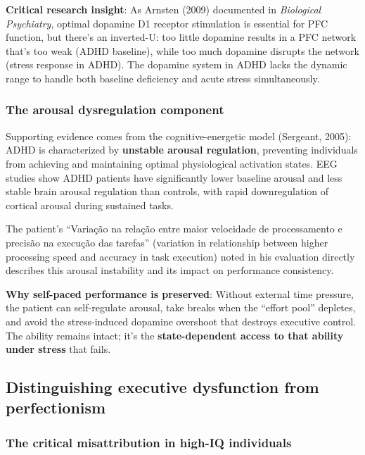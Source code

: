 \textbf{Critical research insight}: As Arnsten (2009) documented in \emph{Biological Psychiatry}, optimal dopamine D1 receptor stimulation is essential for PFC function, but there's an inverted-U: too little dopamine results in a PFC network that's too weak (ADHD baseline), while too much dopamine disrupts the network (stress response in ADHD). The dopamine system in ADHD lacks the dynamic range to handle both baseline deficiency and acute stress simultaneously.

\subsubsection{The arousal dysregulation component}\label{10a_trd_basis-the-arousal-dysregulation-component}

Supporting evidence comes from the cognitive-energetic model (Sergeant, 2005): ADHD is characterized by \textbf{unstable arousal regulation}, preventing individuals from achieving and maintaining optimal physiological activation states. EEG studies show ADHD patients have significantly lower baseline arousal and less stable brain arousal regulation than controls, with rapid downregulation of cortical arousal during sustained tasks.

The patient's ``Variação na relação entre maior velocidade de processamento e precisão na execução das tarefas'' (variation in relationship between higher processing speed and accuracy in task execution) noted in his evaluation directly describes this arousal instability and its impact on performance consistency.

\textbf{Why self-paced performance is preserved}: Without external time pressure, the patient can self-regulate arousal, take breaks when the ``effort pool'' depletes, and avoid the stress-induced dopamine overshoot that destroys executive control. The ability remains intact; it's the \textbf{state-dependent access to that ability under stress} that fails.

\subsection{Distinguishing executive dysfunction from perfectionism}\label{10a_trd_basis-distinguishing-executive-dysfunction-from-perfectionism}

\subsubsection{The critical misattribution in high-IQ individuals}\label{10a_trd_basis-the-critical-misattribution-in-high-iq-individuals}

